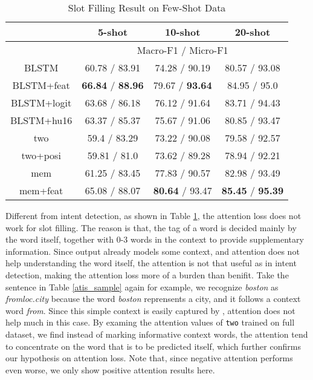 \begin{table}
\setlength{\tabcolsep}{0.23em}
\centering
\small{
\begin{tabular}{|c|c|c|c|}

\hline
  & \multicolumn{1}{|c|}{5-shot} & \multicolumn{1}{|c|}{10-shot} & \multicolumn{1}{|c|}{20-shot}  \\
 \hline
  &  \multicolumn{3}{|c|}{Macro-F1 / Micro-F1}   \\
\hline
BLSTM & 60.78 / 83.91 & 74.28  / 90.19 & 80.57 / 93.08 \\
\hline
BLSTM+feat & \textbf{66.84} / \textbf{88.96} & 79.67 / \textbf{93.64} & 84.95 / 95.0 \\
\hline
BLSTM+logit & 63.68 / 86.18 & 76.12 / 91.64  & 83.71 / 94.43 \\
\hline
BLSTM+hu16 & 63.37 / 85.37 & 75.67 / 91.06 & 80.85 / 93.47 \\
\hline
two & 59.4 / 83.29 & 73.22 / 90.08 & 79.58 / 92.57 \\
\hline
two+posi & 59.81 / 81.0 & 73.62 / 89.28 & 78.94 / 92.21 \\
\hline
mem & 61.25 / 83.45 & 77.83 / 90.57 & 82.98 / 93.49 \\
\hline
mem+feat & 65.08 / 88.07 & \textbf{80.64} / 93.47 & \textbf{85.45} / \textbf{95.39} \\
\hline
\end{tabular}
}
\caption{Slot Filling Result on Few-Shot Data}
\label{tab_slot_few}
\end{table}

Different from intent detection, as shown in Table \ref{tab_slot_few}, the attention loss does not work for slot filling.
The reason is that, the tag of a word is decided mainly by the word itself, together with 0-3 words in the context to provide supplementary information.
Since \BLSTM output already models some context, and attention does not help understanding the word itself, the attention is not that useful as in intent detection, making the attention loss more of a burden than benifit.
Take the sentence in Table \ref{atis_sample} again for example, we recognize \emph{boston} as \emph{fromloc.city} because the word \emph{boston} reprensents a city, and it follows a context word \emph{from}. Since this simple context is easily captured by \BLSTM, attention does not help much in this case.
By examing the attention values of \texttt{two} trained on full dataset,
we find instead of marking informative context words, the attention tend to concentrate on the word that is to be predicted itself, which further confirms our hypothesis on attention loss. 
Note that, since negative attention performs even worse, we only show positive attention results here.

